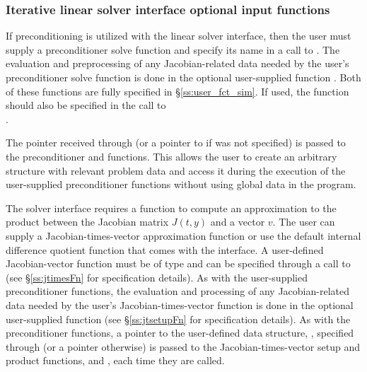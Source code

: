 \subsubsection{Iterative linear solver interface optional input functions}\label{sss:optin_spils}
If preconditioning is utilized with the {\cvspils} linear
solver interface, then the user must supply a preconditioner solve
function  and specify its name in a call to
.
The evaluation and preprocessing of any Jacobian-related data needed
by the user's preconditioner solve function is done in the optional
user-supplied function . Both of these functions are
fully specified in \S\ref{ss:user_fct_sim}.
If used, the  function should also be specified in the call to\\
\noindent{}.

The pointer  received through  (or
a pointer to  if  was not specified)
is passed to the preconditioner  and  functions.
This allows the user to create an arbitrary structure with relevant problem data
and access it during the execution of the user-supplied preconditioner functions
without using global data in the program.

The {\cvspils} solver interface requires a function to compute an
approximation to the product between the Jacobian matrix $J(t,y)$ and
a vector $v$. The user can supply a Jacobian-times-vector
approximation function or use the default internal difference quotient function
that comes with the {\cvspils} interface.  A user-defined Jacobian-vector
function must be of type  and
can be specified through a call to  (see
\S\ref{ss:jtimesFn} for specification details).
As with the user-supplied preconditioner functions, the evaluation and
processing of any Jacobian-related data needed by the user's
Jacobian-times-vector function is done in the optional user-supplied
function  (see \S\ref{ss:jtsetupFn} for specification
details).  As with the preconditioner functions, a pointer to the user-defined
data structure, , specified through
 (or a  pointer otherwise) is passed to
the Jacobian-times-vector setup and product functions,  and
, each time they are called.

